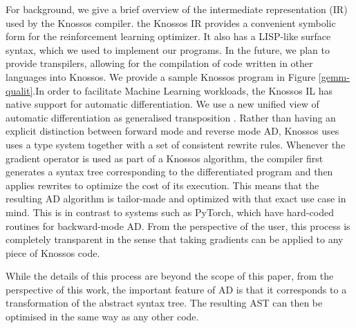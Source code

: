 \documentclass[fullpage,twocolumn]{article} %
\begin{document}
For background, we give a brief overview of the intermediate representation (IR) used by the Knossos compiler. the Knossos IR provides a convenient symbolic form for the reinforcement learning optimizer. It also has a LISP-like surface syntax, which we used to implement our programs. In the future, we plan to provide transpilers, allowing for the compilation of code written in other languages into Knossos. We provide a sample Knossos program in Figure \ref{gemm-qualit}.In order to facilitate Machine Learning workloads, the Knossos IL has native support for automatic differentiation. We use a new unified view of automatic differentiation as generalised transposition \citep{elliottSimpleEssenceAutomatic2018}. Rather than having an explicit distinction between forward mode and reverse mode AD, Knossos uses uses a type system together with a set of consistent rewrite rules. Whenever the gradient operator is used as part of a Knossos algorithm, the compiler first generates a syntax tree corresponding to the differentiated program and then applies rewrites to optimize the cost of its execution. This means that the resulting AD algorithm is tailor-made and optimized with that exact use case in mind. This is in contrast to systems such as PyTorch, which have hard-coded routines for backward-mode AD. From the perspective of the user, this process is completely transparent in the sense that taking gradients can be applied to any piece of Knossos code. 

While the details of this process are beyond the scope of this paper, from the perspective of this work, the important feature of AD is that it corresponds to a transformation of the abstract syntax tree. The resulting AST can then be optimised in the same way as any other code.

\end{document}

